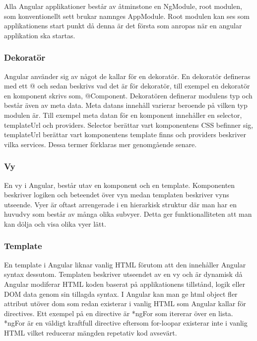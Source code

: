 Alla Angular applikationer består av åtminstone en NgModule, root modulen, som konventionellt sett brukar namnges AppModule.    Root modulen kan ses som applikationens start punkt då denna är det första som anropas när en angular applikation ska startas.


\subsubsection{Dekoratör}
Angular använder sig av något de kallar för en dekoratör. En dekoratör defineras med ett @ och sedan beskrivs vad det är för dekoratör, till exempel en dekoratör en komponent skrivs som, @Component. Dekoratören definerar modulens typ och består även av meta data. Meta datans innehåll varierar beroende på vilken typ modulen är. Till exempel meta datan för en komponent innehåller en selector, templateUrl och providers. Selector berättar vart komponentens CSS befinner sig, templateUrl berättar vart komponentens template finns och providers beskriver vilka services. Dessa termer förklaras mer genomgående senare.


\subsubsection{Vy}
En vy i Angular, består utav en komponent och en template. Komponenten beskriver logiken och beteendet över vyn medan templaten beskriver vyns utseende. Vyer är oftast arrengerade i en hierarkisk struktur där man har en huvudvy som består av många olika subvyer. Detta ger funktionalliteten att man kan dölja och visa olika vyer lätt. 

\subsubsection{Template}
En template i Angular liknar vanlig HTML förutom att den innehåller Angular syntax dessutom. Templaten beskriver utseendet av en vy och är dynamisk då Angular modiferar HTML koden baserat på applikationens tillstånd, logik eller DOM data genom sin tillagda syntax. I Angular kan man ge html object fler attribut utöver dom som redan existerar i vanlig HTML som Angular kallar för directives. Ett exempel på en directive är *ngFor som itererar över en lista. *ngFor är en väldigt kraftfull directive eftersom for-loopar existerar inte i vanlig HTML vilket reducerar mängden repetativ kod avsevärt.

